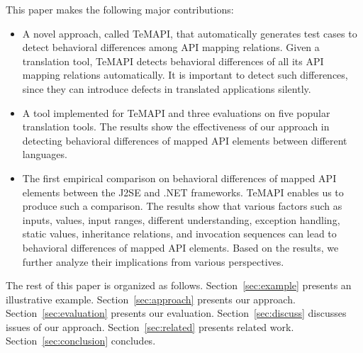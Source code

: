 This paper makes the following major contributions:

\begin{itemize}\vspace*{-1.5ex}
\item A novel approach, called TeMAPI, that automatically generates test cases to detect behavioral differences among API mapping relations. Given a translation tool, TeMAPI detects behavioral differences of all its API mapping relations automatically. It is important to detect such differences, since they can introduce defects in translated applications silently.%
\item A tool implemented for TeMAPI and three evaluations on five popular translation tools. The results show the effectiveness of our approach in detecting behavioral differences of mapped API elements between different languages.
\item The first empirical comparison on behavioral differences of mapped API elements between the J2SE and .NET frameworks. TeMAPI enables us to produce such a comparison. The results show that various factors such as  inputs,  values, input ranges, different understanding, exception handling, static values, inheritance relations, and invocation sequences can lead to behavioral differences of mapped API elements. Based on the results, we further analyze their implications from various perspectives.
\end{itemize}\vspace*{-1.5ex}

The rest of this paper is organized as follows.
Section~\ref{sec:example} presents an illustrative example.
Section~\ref{sec:approach} presents our approach.
Section~\ref{sec:evaluation} presents our evaluation.
Section~\ref{sec:discuss} discusses issues of our approach.
Section~\ref{sec:related} presents related work.
Section~\ref{sec:conclusion} concludes.


